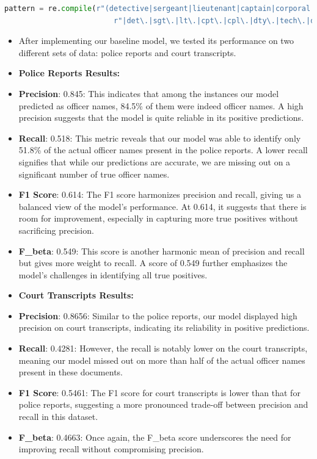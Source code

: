 \documentclass{article}
\begin{document}
\begin{lstlisting}[language=Python, caption=Code Snippet 1, breaklines=true]
    pattern = re.compile(r"(detective|sergeant|lieutenant|captain|corporal|deputy|criminalist|technician|investigator"
                         r"|det\.|sgt\.|lt\.|cpt\.|cpl\.|dty\.|tech\.|dr\.)\s+([A-Z][A-Za-z]*(\s[A-Z][A-Za-z]*)?)", re.IGNORECASE)
\end{lstlisting}
    

\begin{itemize}
    \item After implementing our baseline model, we tested its performance on two different sets of data: police reports and court transcripts.
    \item \textbf{Police Reports Results:}
    \item \textbf{Precision}: 0.845: This indicates that among the instances our model predicted as officer names, 84.5\% of them were indeed officer names. A high precision suggests that the model is quite reliable in its positive predictions.
    \item \textbf{Recall}: 0.518: This metric reveals that our model was able to identify only 51.8\% of the actual officer names present in the police reports. A lower recall signifies that while our predictions are accurate, we are missing out on a significant number of true officer names.
    \item \textbf{F1 Score}: 0.614: The F1 score harmonizes precision and recall, giving us a balanced view of the model's performance. At 0.614, it suggests that there is room for improvement, especially in capturing more true positives without sacrificing precision.
    \item \textbf{F\_beta}: 0.549: This score is another harmonic mean of precision and recall but gives more weight to recall. A score of 0.549 further emphasizes the model's challenges in identifying all true positives.
    \item \textbf{Court Transcripts Results:}
    \item \textbf{Precision}: 0.8656: Similar to the police reports, our model displayed high precision on court transcripts, indicating its reliability in positive predictions.
    \item \textbf{Recall}: 0.4281: However, the recall is notably lower on the court transcripts, meaning our model missed out on more than half of the actual officer names present in these documents.
    \item \textbf{F1 Score}: 0.5461: The F1 score for court transcripts is lower than that for police reports, suggesting a more pronounced trade-off between precision and recall in this dataset.
    \item \textbf{F\_beta}: 0.4663: Once again, the F\_beta score underscores the need for improving recall without compromising precision.
\end{itemize}
\end{document}

